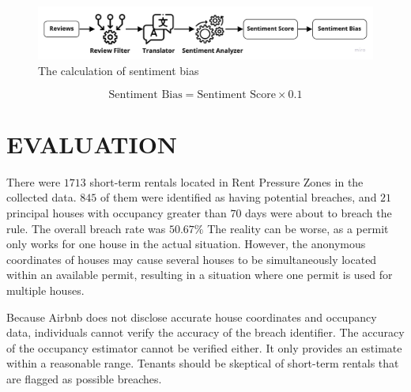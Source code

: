 \documentclass[conference, compsoc]{IEEEtran}
\begin{document}
\begin{figure}[htbp]
    \centerline{\includegraphics[width=\linewidth]{figures/sentiment-bias.jpg}}
    \caption{The calculation of sentiment bias}
    \label{fig:sentiment-bias}
\end{figure}

\begin{equation}
    \text{Sentiment Bias} = \text{Sentiment Score} \times 0.1
    \label{eq:sentiment-bias}
\end{equation}


\section{EVALUATION}
There were $1713$ short-term rentals located in Rent Pressure Zones in the collected data.
$845$ of them were identified as having potential breaches, and $21$ principal houses with occupancy greater than $70$ days were about to breach the rule.
The overall breach rate was $50.67\%$
The reality can be worse, as a permit only works for one house in the actual situation.
However, the anonymous coordinates of houses may cause several houses to be simultaneously located within an available permit, resulting in a situation where one permit is used for multiple houses.

Because Airbnb does not disclose accurate house coordinates and occupancy data,
individuals cannot verify the accuracy of the breach identifier.
The accuracy of the occupancy estimator cannot be verified either.
It only provides an estimate within a reasonable range.
Tenants should be skeptical of short-term rentals that are flagged as possible breaches.
\end{document}

